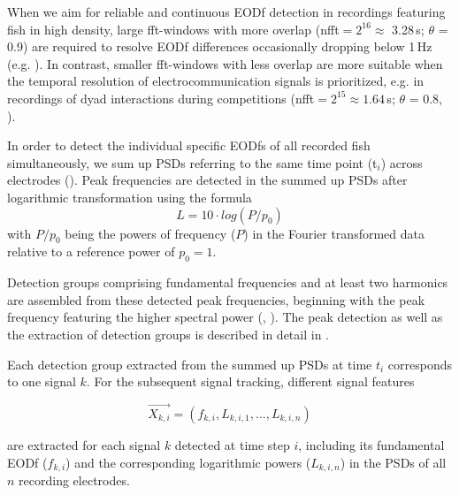 When we aim for reliable and continuous EODf detection in recordings featuring fish in high density, large fft-windows with more overlap (nfft$=2^{16} \approx$  3.28\,s; $\theta$ = 0.9) are required to resolve EODf differences occasionally dropping below 1\,Hz (e.g. \citealp{Raab2019}). In contrast, smaller fft-windows with less overlap are more suitable when the temporal resolution of electrocommunication signals is prioritized, e.g. in recordings of dyad interactions during competitions (nfft$=2^{15} \approx  1.64$\,s; $\theta$ = 0.8, \citealp{Raab2021}). 

In order to detect the individual specific EODfs of all recorded fish simultaneously, we sum up PSDs referring to the same time point (t$_i$) across electrodes (). Peak frequencies are detected in the summed up PSDs after logarithmic transformation \citep{Todd1999, Henninger2020} using the formula
\begin{equation}
L = 10 \cdot log(P/p_0)
\end{equation}
with $P/p_0$ being the powers of frequency ($P$) in the Fourier transformed data relative to a reference power of $p_0 = 1$. 

Detection groups comprising fundamental frequencies and at least two harmonics are assembled from these detected peak frequencies, beginning with the peak frequency featuring the higher spectral power (, \citealp{Henninger2020}). The peak detection as well as the extraction of detection groups is described in detail in \citet{Henninger2020}. 

Each detection group extracted from the summed up PSDs at time $t_i$ corresponds to one signal $k$. For the subsequent signal tracking, different signal features 

\begin{equation}
 \vec{X_{k, i}} = (f_{k,i}, L_{k, i, 1},  ..., L_{k, i, n})
 \label{signal_features}
\end{equation}

are extracted for each signal $k$ detected at time step $i$, including its fundamental EODf ($f_{k,i}$) and the corresponding logarithmic powers ($L_{k, i, n}$) in the PSDs of all $n$ recording electrodes. 

